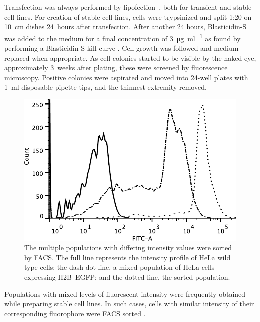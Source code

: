     Transfection was always performed by lipofection~,
    both for transient and stable cell lines. For creation of stable cell lines,
    cells were trypsinized and split 1:20 on \SI{10}{\cm} dishes 24~hours after transfection.
    After another 24 hours, Blasticidin-S was added to the medium for
    a final concentration of \SI{3}{\ug\per\ml} as found by performing a
    Blasticidin-S kill-curve .
    Cell growth was followed and medium replaced when appropriate.
    As cell colonies started to be visible by the naked eye, approximately
    3~weeks after plating, these were screened by fluorescence microscopy.
    Positive colonies were aspirated and moved into 24-well plates with
    \SI{1}{\ml} disposable pipette tips, and the thinnest extremity removed.

    \begin{figure}
      \centering
      \includegraphics[width=\textwidth]{figs/facs-stable-cell-lines.pdf}
        {
          The multiple populations with differing intensity values were
          sorted by FACS. The full line represents the intensity profile
          of HeLa wild type cells; the dash-dot line, a mixed population
          of HeLa cells expressing H2B--EGFP; and the dotted line, the
          sorted population.
        }
      \label{fig:methods:facs}
    \end{figure}

    Populations with mixed levels of fluorescent intensity were frequently
    obtained while preparing stable cell lines. In such cases, cells with
    similar intensity of their corresponding fluorophore were FACS
    sorted .


